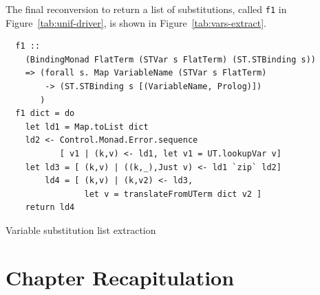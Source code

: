 \documentclass[thesis-solanki.tex]{subfiles}
\begin{document}
The final reconversion to return a list of substitutions,
  called \texttt{f1} in Figure~\ref{tab:unif-driver}, is shown in
  Figure~\ref{tab:vars-extract}.
\begin{code-list}
  \begin{verbatim}
  f1 ::
    (BindingMonad FlatTerm (STVar s FlatTerm) (ST.STBinding s))
    => (forall s. Map VariableName (STVar s FlatTerm)
        -> (ST.STBinding s [(VariableName, Prolog)])
       )
  f1 dict = do
    let ld1 = Map.toList dict
    ld2 <- Control.Monad.Error.sequence
           [ v1 | (k,v) <- ld1, let v1 = UT.lookupVar v]
    let ld3 = [ (k,v) | ((k,_),Just v) <- ld1 `zip` ld2]
        ld4 = [ (k,v) | (k,v2) <- ld3,
                let v = translateFromUTerm dict v2 ]
    return ld4
  \end{verbatim}
  \vspace*{-1.0\baselineskip}
  \caption{Variable substitution list extraction}
  \label{tab:vars-extract}
\end{code-list}

\section{Chapter Recapitulation}

\ifMain
\begin{scope}
  \nolinenumbers
  \enotesize
  \par
  \begin{singlespace}
  \setlength{\parskip}{12pt plus 2pt minus 1pt}
  \theendnotes
  \par
  \end{singlespace}
\end{scope}
\fi
\end{document}
